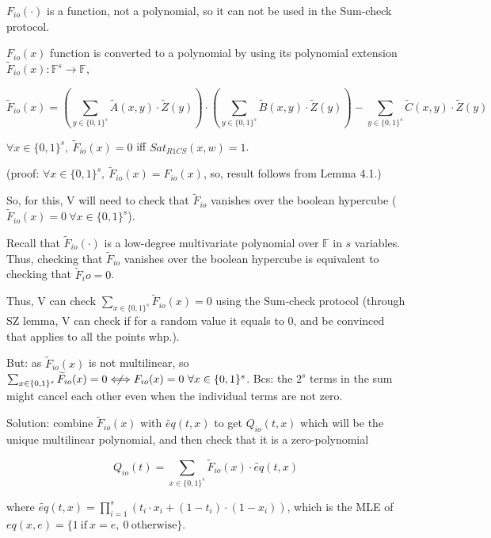 \documentclass{article}
\theoremstyle{definition}
\newenvironment{lemma}[1]
{\renewcommand\theinnerlemma{#1}\innerlemma}
{\endinnerlemma}
\begin{document}
$F_{io}(\cdot)$ is a function, not a polynomial, so it can not be used in the Sum-check protocol.

$F_{io}(x)$ function is converted to a polynomial by using its polynomial extension $\widetilde{F}_{io}(x): \mathbb{F}^s \rightarrow \mathbb{F}$,
\begin{small}
$$
\widetilde{F}_{io}(x)=\left( \sum_{y \in \{0,1\}^s} \widetilde{A}(x, y) \cdot \widetilde{Z}(y) \right) \cdot \left( \sum_{y \in \{0,1\}^s} \widetilde{B}(x, y) \cdot \widetilde{Z}(y) \right) - \sum_{y \in \{0,1\}^s} \widetilde{C}(x, y) \cdot \widetilde{Z}(y)
$$
\end{small}

\begin{lemma}{4.2}
	$\forall x \in \{0,1\}^s,~ \widetilde{F}_{io}(x)=0$ iff $Sat_{R1CS}(x, w)=1$.
\end{lemma}

(proof: $\forall x \in \{0,1\}^s,~ \widetilde{F}_{io}(x)=F_{io}(x)$, so, result follows from Lemma 4.1.) %

\vspace{0.5cm}

So, for this, V will need to check that $\widetilde{F}_{io}$ vanishes over the boolean hypercube ($\widetilde{F}_{io}(x)=0 ~\forall x \in \{0,1\}^s$).

Recall that $\widetilde{F}_{io}(\cdot)$ is a low-degree multivariate polynomial over $\mathbb{F}$ in $s$ variables.
Thus, checking that $\widetilde{F}_{io}$ vanishes over the boolean hypercube is equivalent to checking that $\widetilde{F}_io=0$.

Thus, V can check $\sum_{x \in \{0,1\}^s} \widetilde{F}_{io}(x)=0$ using the Sum-check protocol (through SZ lemma, V can check if for a random value it equals to 0, and be convinced that applies to all the points whp.).

But: as $\widetilde{F}_{io}(x)$ is not multilinear, so $\sum_{x\in \{0,1\}^s} \widetilde{F}_{io}(x)=0 \centernot\Longleftrightarrow F_{io}(x)=0 ~\forall x \in \{0,1\}^s$.
Bcs: the $2^s$ terms in the sum might cancel each other even when the individual terms are not zero.

Solution: combine $\widetilde{F}_{io}(x)$ with $\widetilde{eq}(t, x)$ to get $Q_{io}(t, x)$ which will be the unique multilinear polynomial, and then check that it is a zero-polynomial

$$Q_{io}(t)= \sum_{x \in \{0,1\}^s} \widetilde{F}_{io}(x) \cdot \widetilde{eq}(t, x)$$

where $\widetilde{eq}(t, x) = \prod_{i=1}^s (t_i \cdot x_i + (1- t_i) \cdot (1- x_i))$, which is the MLE of $eq(x,e)= \{ 1 ~\text{if}~ x=e,~ 0 ~\text{otherwise} \}$.
\end{document}
